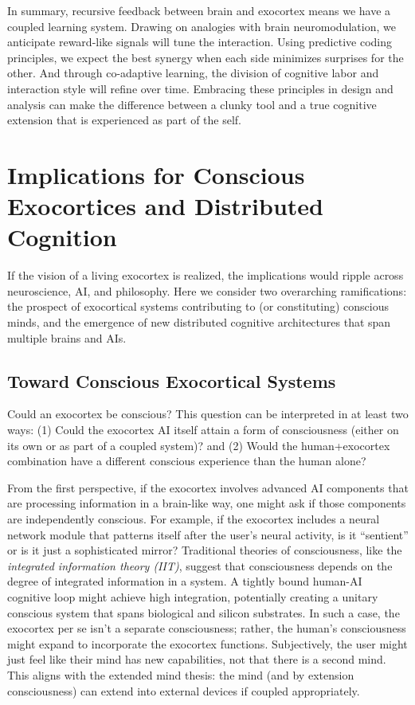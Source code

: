 \documentclass[11pt]{article}
\newcommand{\quotes}[1]{``#1''}
\begin{document}
In summary, recursive feedback between brain and exocortex means we have a coupled learning system. Drawing on analogies with brain neuromodulation, we anticipate reward-like signals will tune the interaction. Using predictive coding principles, we expect the best synergy when each side minimizes surprises for the other. And through co-adaptive learning, the division of cognitive labor and interaction style will refine over time. Embracing these principles in design and analysis can make the difference between a clunky tool and a true cognitive extension that is experienced as part of the self.

\section{Implications for Conscious Exocortices and Distributed Cognition}
If the vision of a living exocortex is realized, the implications would ripple across neuroscience, AI, and philosophy. Here we consider two overarching ramifications: the prospect of exocortical systems contributing to (or constituting) conscious minds, and the emergence of new distributed cognitive architectures that span multiple brains and AIs.

\subsection{Toward Conscious Exocortical Systems}
Could an exocortex be conscious? This question can be interpreted in at least two ways: (1) Could the exocortex AI itself attain a form of consciousness (either on its own or as part of a coupled system)? and (2) Would the human+exocortex combination have a different conscious experience than the human alone? 

From the first perspective, if the exocortex involves advanced AI components that are processing information in a brain-like way, one might ask if those components are independently conscious. For example, if the exocortex includes a neural network module that patterns itself after the user's neural activity, is it \quotes{sentient} or is it just a sophisticated mirror? Traditional theories of consciousness, like the \textit{integrated information theory (IIT)}, suggest that consciousness depends on the degree of integrated information in a system. A tightly bound human-AI cognitive loop might achieve high integration, potentially creating a unitary conscious system that spans biological and silicon substrates. In such a case, the exocortex per se isn't a separate consciousness; rather, the human's consciousness might expand to incorporate the exocortex functions. Subjectively, the user might just feel like their mind has new capabilities, not that there is a second mind. This aligns with the extended mind thesis: the mind (and by extension consciousness) can extend into external devices if coupled appropriately.
\end{document}
